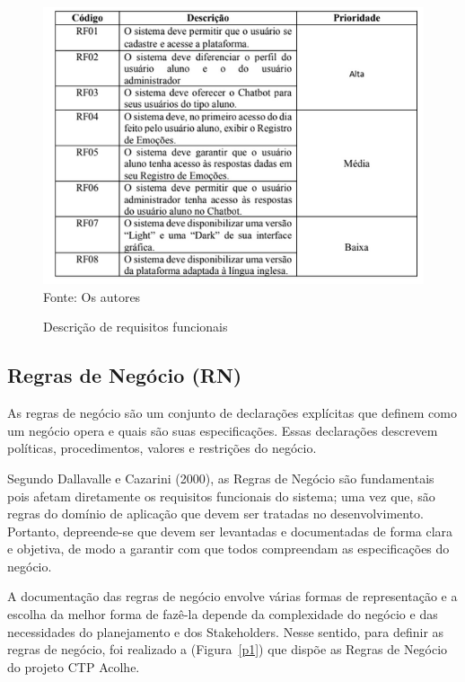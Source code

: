 \documentclass[12pt,a4paper]{article}
\begin{document}
\begin{figure}[H]
    \centering
    \caption{Descrição de requisitos funcionais}
     \includegraphics[width=15cm]{img6.png}
    Fonte: Os autores
    \label{o6}
\end{figure}

\subsection{Regras de Negócio (RN)}
As regras de negócio são um conjunto de declarações explícitas que definem como um negócio opera e quais são suas especificações. Essas declarações descrevem políticas, procedimentos, valores e restrições do negócio.

Segundo Dallavalle e Cazarini (2000), as Regras de Negócio são fundamentais pois afetam diretamente os requisitos funcionais do sistema; uma vez que, são regras do domínio de aplicação que devem ser tratadas no desenvolvimento.
Portanto, depreende-se que devem ser levantadas e documentadas de forma clara e objetiva, de modo a garantir com que todos compreendam as especificações do negócio. \cite{artigoo}

A documentação das regras de negócio envolve várias formas de representação e a escolha da melhor forma de fazê-la depende da complexidade do negócio e das necessidades do planejamento e dos \gls{Stakeholders}. Nesse sentido, para definir as regras de negócio, foi realizado a (Figura~\ref{p1}) que dispõe as Regras de Negócio do projeto \gls{CTP Acolhe}. \cite{artigoo}
\end{document}
